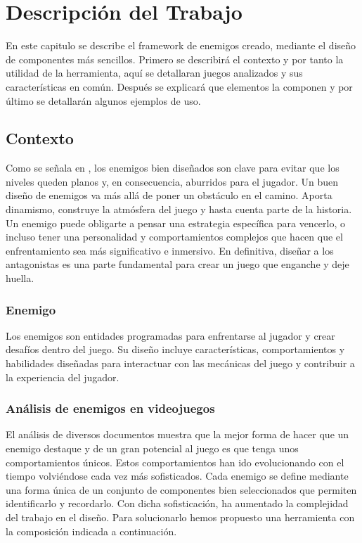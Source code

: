 
\chapter{Descripción del Trabajo}
\label{cap:descripcionTrabajo}
En este capitulo se describe el framework de enemigos creado, mediante el diseño de componentes más sencillos. 
Primero se describirá el contexto y por tanto la utilidad de la herramienta, aquí se detallaran juegos analizados y sus características en común. Después se explicará que elementos la componen y por último se detallarán algunos ejemplos de uso. \\
\section{Contexto}
Como se señala en  \citet{Build_a_Bad_Guy_Workshop}, los enemigos bien diseñados son clave para evitar que los niveles queden planos y, en consecuencia, aburridos para el jugador.
Un buen diseño de enemigos va más allá de poner un obstáculo en el camino. Aporta dinamismo, construye la atmósfera del juego y hasta cuenta parte de la historia. Un enemigo puede obligarte a pensar una estrategia específica para vencerlo, o incluso tener una personalidad y comportamientos complejos que hacen que el enfrentamiento sea más significativo e inmersivo. En definitiva, diseñar a los antagonistas es una parte fundamental para crear un juego que enganche y deje huella.

\subsection{Enemigo}
Los enemigos son entidades programadas para enfrentarse al jugador y crear desafíos dentro del juego. Su diseño incluye características, comportamientos y habilidades diseñadas para interactuar con las mecánicas del juego y contribuir a la experiencia del jugador. \\
\subsection{Análisis de enemigos en videojuegos}
El análisis de diversos documentos muestra que la mejor forma de hacer que un enemigo destaque y de un gran potencial al juego es que tenga unos comportamientos únicos. Estos comportamientos han ido evolucionando con el tiempo volviéndose cada vez más sofisticados. Cada enemigo se define mediante una forma única de un conjunto de componentes bien seleccionados que permiten identificarlo y recordarlo.
Con dicha sofisticación, ha aumentado la complejidad del trabajo en el diseño. Para solucionarlo hemos propuesto una herramienta con la composición indicada a continuación.


